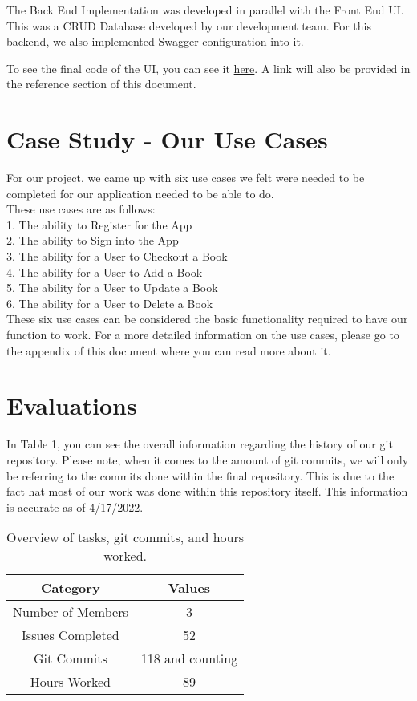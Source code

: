 \documentclass{article}
\begin{document}
	The Back End Implementation was developed in parallel with the Front End UI. This  was a CRUD Database developed by our development team. For this backend, we also implemented Swagger configuration into it.
	
	To see the final code of the UI, you can see it \href{https://tinyurl.com/3hfpxrvc}{here}. A link will also be provided in the reference section of this document.
	
	\section{Case Study - Our Use Cases}
	
	For our project, we came up with six use cases we felt were needed to be completed for our application needed to be able to do. \\
	
	These use cases are as follows: \\
	1. The ability to Register for the App \\
	2. The ability to Sign into the App\\
	3. The ability for a User to Checkout a Book\\
	4. The ability for a User to Add a Book\\
	5. The ability for a User to Update a Book\\
	6. The ability for a User to Delete a Book\\
	
	These six use cases can be considered the basic functionality required to have our function to work. For a more detailed information on the use cases, please go to the appendix of this document where you can read more about it.
	
	
	\section{Evaluations}
	
	In Table 1, you can see the overall information regarding the history of our git repository. Please note, when it comes to the amount of git commits, we will only be referring to the commits done within the final repository. This is due to the fact hat most of our work was done within this repository itself. This information is accurate as of 4/17/2022. \\
	
	\begin{table}[htbp!]
		\centering
		\begin{tabular}{||c c ||} 
			\hline
			Category & Values \\ [0.5ex] 
			\hline\hline
			Number of Members & 3 \\
			Issues Completed & 52  \\ 
			Git Commits & 118 and counting \\
			Hours Worked & 89 \\
			\hline
		\end{tabular}
		\caption{Overview of tasks, git commits, and hours worked.}
		\label{table:1}
	\end{table}
	
\end{document}
